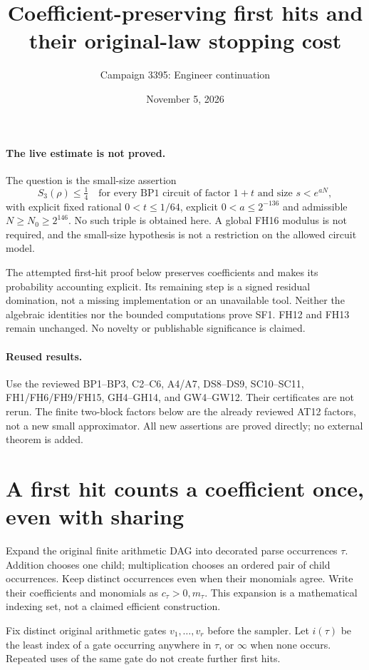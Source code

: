 \documentclass[11pt]{article}
\title{Coefficient-preserving first hits and their original-law stopping cost}
\author{Campaign 3395: Engineer continuation}
\date{November 5, 2026}
\begin{document}
\maketitle

\paragraph{The live estimate is not proved.}
The question is the small-size assertion
\[
 S_3(\rho)\le\tfrac14
 \quad\text{for every BP1 circuit of factor }1+t
 \text{ and size }s<e^{aN},                         \tag{SF1}
\]
with explicit fixed rational $0<t\le1/64$, explicit
$0<a\le2^{-136}$ and admissible $N\ge N_0\ge2^{146}$.
No such triple is obtained here. A global FH16 modulus is not
required, and the small-size hypothesis is not a restriction on the
allowed circuit model.

The attempted first-hit proof below preserves coefficients and makes
its probability accounting explicit. Its remaining step is a signed
residual domination, not a missing implementation or an unavailable
tool. Neither the algebraic identities nor the bounded computations
prove SF1. FH12 and FH13 remain unchanged. No novelty or publishable
significance is claimed.

\paragraph{Reused results.}
Use the reviewed BP1--BP3, C2--C6, A4/A7, DS8--DS9,
SC10--SC11, FH1/FH6/FH9/FH15, GH4--GH14, and GW4--GW12.
Their certificates are not rerun. The finite two-block factors below
are the already reviewed AT12 factors, not a new small approximator.
All new assertions are proved directly; no external theorem is added.

\section{A first hit counts a coefficient once, even with sharing}
Expand the original finite arithmetic DAG into decorated parse
occurrences $\tau$. Addition chooses one child; multiplication chooses
an ordered pair of child occurrences. Keep distinct occurrences even
when their monomials agree. Write their coefficients and monomials as
$c_\tau>0,m_\tau$. This expansion is a mathematical indexing set,
not a claimed efficient construction.

Fix distinct original arithmetic gates $v_1,\ldots,v_r$ before the
sampler. Let $i(\tau)$ be the least index of a gate occurring anywhere
in $\tau$, or $\infty$ when none occurs. Repeated uses of the same
gate do not create further first hits.
\end{document}
